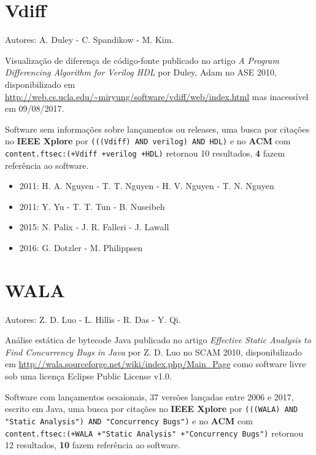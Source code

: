 \section{Vdiff}

Autores:
A. Duley - C. Spandikow - M. Kim.

Visualização de diferença de código-fonte
publicado no artigo {\it A Program Differencing Algorithm for Verilog HDL}
por Duley, Adam
no ASE 2010,
disponibilizado em \url{http://web.cs.ucla.edu/~miryung/software/vdiff/web/index.html}
mas inacessível em 09/08/2017.

Software sem informações sobre lançamentos ou releases,
uma busca por citações no {\bf IEEE Xplore} por
\texttt{(((Vdiff) AND verilog) AND HDL)}
e no {\bf ACM} com
\texttt{content.ftsec:(+Vdiff +verilog +HDL)}
retornou
10 resultados,
{\bf 4} fazem referência ao software.

\begin{itemize}
\item 2011: H. A. Nguyen - T. T. Nguyen - H. V. Nguyen - T. N. Nguyen
\item 2011: Y. Yu - T. T. Tun - B. Nuseibeh
\item 2015: N. Palix - J. R. Falleri - J. Lawall
\item 2016: G. Dotzler - M. Philippsen
\end{itemize}

\section{WALA}

Autores:
Z. D. Luo - L. Hillis - R. Das - Y. Qi.

Análise estática de bytecode Java
publicado no artigo {\it Effective Static Analysis to Find Concurrency Bugs in Java}
por Z. D. Luo
no SCAM 2010,
disponibilizado em \url{http://wala.sourceforge.net/wiki/index.php/Main_Page}
como software livre
sob uma licença Eclipse Public License v1.0.

Software com lançamentos ocsaionais,
37 versões lançadas
entre 2006 e 2017,
escrito em Java,
uma busca por citações no {\bf IEEE Xplore} por
\texttt{(((WALA) AND "Static Analysis") AND "Concurrency Bugs")}
e no {\bf ACM} com
\texttt{content.ftsec:(+WALA +"Static Analysis" +"Concurrency Bugs")}
retornou
12 resultados,
{\bf 10} fazem referência ao software.

